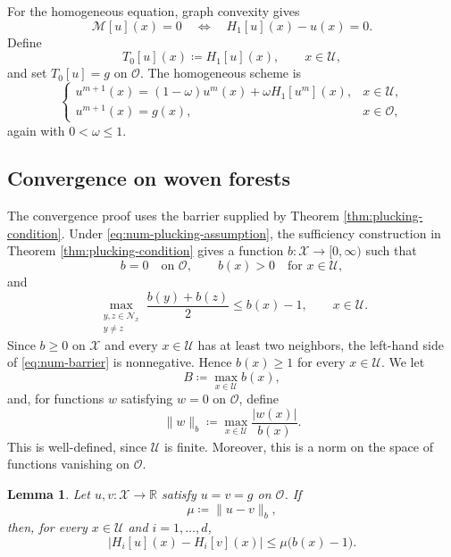 \documentclass[reqno,11pt]{amsart}
\numberwithin{equation}{section}
\newtheorem{lemma}[theorem]{Lemma}
\theoremstyle{definition}
\theoremstyle{remark}
\begin{document}
For the homogeneous equation, graph convexity gives
\[
    \mathcal M [u](x)=0
    \quad\Longleftrightarrow\quad
    H_1[u](x)-u(x)=0.
\]
Define
\[
    T_0[u](x)\coloneqq H_1[u](x),
    \qquad x\in \mathcal{U},
\]
and set \(T_0[u]=g\) on \(\mathcal O\). The homogeneous scheme is
\begin{equation}\label{eq:num-hom-scheme}
    \begin{cases}
    u^{m+1}(x)
    =
    (1-\omega)u^m(x)+\omega H_1[u^m](x),
    &x\in \mathcal{U},\\[0.7ex]
    u^{m+1}(x)=g(x),
    &x\in\mathcal O,
    \end{cases}
\end{equation}
again with \(0<\omega\le 1\).

\subsection{Convergence on woven forests}

The convergence proof uses the barrier supplied by Theorem \ref{thm:plucking-condition}.  Under \eqref{eq:num-plucking-assumption}, the sufficiency construction in Theorem \ref{thm:plucking-condition} gives a function \(b\colon\mathcal X\to[0,\infty)\) such that
\[
    b=0
    \quad\text{on }\mathcal O,
    \qquad
    b(x)>0
    \quad\text{for }x\in \mathcal{U},
\]
and
\begin{equation}\label{eq:num-barrier}
    \max_{\substack{y,z\in\mathcal N_x\\ y\ne z}}
    \frac{b(y)+b(z)}2
    \le b(x)-1,
    \qquad x\in \mathcal{U}.
\end{equation}
Since $b\ge0$ on $\mathcal X$ and every $x\in \mathcal{U}$ has at least two
neighbors, the left-hand side of \eqref{eq:num-barrier} is
nonnegative. Hence $b(x)\ge1$ for every $x\in \mathcal{U}$. We let
\[
    B\coloneqq \max_{x\in \mathcal{U}} b(x),
\]
and, for functions \(w\) satisfying \(w=0\) on \(\mathcal O\), define
\[
    \|w\|_b
    \coloneqq
    \max_{x\in \mathcal{U}}\frac{|w(x)|}{b(x)}.
\]
This is well-defined, since \(\mathcal{U}\) is finite. Moreover, this is a norm on the space of functions vanishing on \(\mathcal O\).

\begin{lemma}\label{lem:num-H-contraction}
Let \(u,v\colon\mathcal X\to\mathbb R\) satisfy \(u=v=g\) on \(\mathcal O\).
If
\[
    \mu\coloneqq \|u-v\|_b,
\]
then, for every \(x\in \mathcal{U}\) and \(i=1,\dots,d\),
\begin{equation}\label{eq:num-H-estimate}
    |H_i[u](x)-H_i[v](x)|
    \le
    \mu\bigl(b(x)-1\bigr).
\end{equation}
\end{lemma}
\end{document}
